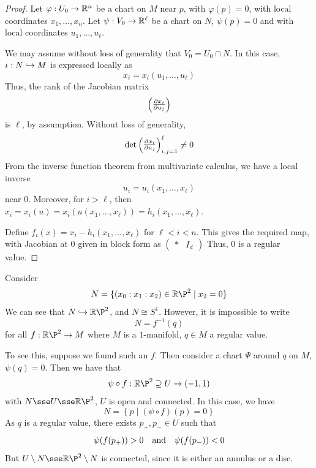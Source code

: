 \documentclass{article}
\begin{document}
\begin{proof}
    Let \(\varphi : U_0 \to \mathbb{R}^n\) be a chart on \(M\) near \(p\), with \(\varphi(p) = 0\), with local coordinates \(x_1, \dots, x_n\). Let \(\psi : V_0 \to \mathbb{R}^\ell\) be a chart on \(N\), \(\psi(p) = 0\) and with local coordinates \(u_1, \dots, u_\ell\).

    We may assume without loss of generality that \(V_0 = U_0 \cap N\). In this case, \(\iota : N \hookrightarrow M\) is expressed locally as
    \[x_i = x_i(u_1, \dots, u_\ell)\]
    Thus, the rank of the Jacobian matrix
    \[\begin{pmatrix}
        \pdv{x_i}{u_j}(0)
    \end{pmatrix}\]
    is \(\ell\), by assumption. Without loss of generality,
    \[\det\begin{pmatrix}
        \pdv{x_i}{u_j}(0)
    \end{pmatrix}_{i, j = 1}^\ell \ne 0\]
    From the inverse function theorem from multivariate calculus, we have a local inverse
    \[u_i = u_i(x_1, \dots, x_\ell)\]
    near \(0\). Moreover, for \(i > \ell\), then \(x_i = x_i(u) = x_i(u(x_1, \dots, x_\ell)) = h_i(x_1, \dots, x_\ell)\).

    Define \(f_i(x) = x_i - h_i(x_1, \dots, x_\ell)\) for \(\ell < i < n\). This gives the required map, with Jacobian at \(0\) given in block form as
    \(\begin{pmatrix}
        * & I_d
    \end{pmatrix}\)
    Thus, \(0\) is a regular value.
\end{proof}

\begin{example}
    Consider
    \[N = \{(x_0:x_1:x_2) \in \R\P^2 \mid x_2 = 0\}\]
    We can see that \(N \inj \R\P^2\), and \(N \cong S^1\). However, it is impossible to write
    \[N = f^{-1}(q)\]
    for all \(f : \R\P^2 \to M\) where \(M\) is a \(1\)-manifold, \(q \in M\) a regular value.

    To see this, suppose we found such an \(f\). Then consider a chart \(\Psi\) around \(q\) on \(M\), \(\psi(q) = 0\). Then we have that
    \[\psi \circ f : \R\P^2 \supseteq U \to (-1, 1)\]
    with \(N \sse U \sse \R\P^2\), \(U\) is open and connected. In this case, we have
    \[N = \left\{p \mid (\psi \circ f)(p) = 0\right\}\]
    As \(q\) is a regular value, there exists \(p_+, p_- \in U\) such that
    \[\psi(f(p_+)) > 0 \qqtext{and} \psi(f(p_-)) < 0\]
    But \(U \setminus N \sse \R\P^2 \setminus N\) is connected, since it is either an annulus or a disc.
\end{example}
\end{document}
